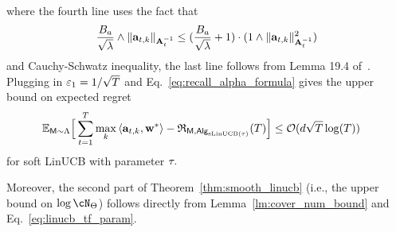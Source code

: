 where the fourth line uses the fact that
\begin{align*}
 \frac{B_a}{\sqrt{\lambda}}\wedge\|{\mathbf a}_{t,k}\|_{{\mathbf A}^{-1}_t}\leq (\frac{B_a}{\sqrt{\lambda}}+1)\cdot(1\wedge\|{\mathbf a}_{t,k}\|^2_{{\mathbf A}^{-1}_t})
\end{align*}
and Cauchy-Schwatz inequality, the last line follows from Lemma 19.4 of~\cite{lattimore2020bandit}. Plugging in $\varepsilon_1=1/\sqrt{T}$ and Eq.~\eqref{eq:recall_alpha_formula} gives the upper bound on expected regret
\begin{align*}
\mathbb{E}_{{\mathsf{M}}\sim{\Lambda}}\Big[\sum_{t=1}^{T}\max_{k}\left\langle{\mathbf a}_{t,k},{\mathbf w}^*\right\rangle-{\mathfrak{R}}_{{\mathsf{M}},{\mathsf{Alg}}_{{\mathrm{sLinUCB}}({\tau})}}({T})\Big]&\leq\mathcal{O}(d\sqrt{T}\log(T))
\end{align*}
for soft LinUCB with parameter ${\tau}.$

Moreover, the second part of Theorem~\ref{thm:smooth_linucb} (i.e., the upper bound on $\log\cN_{\tfparspace}$) follows directly from Lemma~\ref{lm:cover_num_bound} and Eq.~\eqref{eq:linucb_tf_param}.







































































